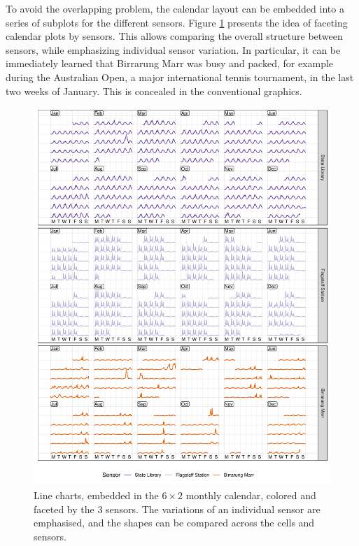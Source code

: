 \documentclass[12pt]{article}
\begin{document}
To avoid the overlapping problem, the calendar layout can be embedded into a series of subplots for the different sensors. Figure \ref{fig:facet} presents the idea of faceting calendar plots by sensors. This allows comparing the overall structure between sensors, while emphasizing individual sensor variation. In particular, it can be immediately learned that Birrarung Marr was busy and packed, for example during the Australian Open, a major international tennis tournament, in the last two weeks of January. This is concealed in the conventional graphics.

\begin{figure}

{\centering \includegraphics[width=\textwidth]{figure/facet-1} 

}

\caption{Line charts, embedded in the \(6 \times 2\) monthly calendar, colored and faceted by the 3 sensors. The variations of an individual sensor are emphasised, and the shapes can be compared across the cells and sensors.}\label{fig:facet}
\end{figure}
\end{document}
